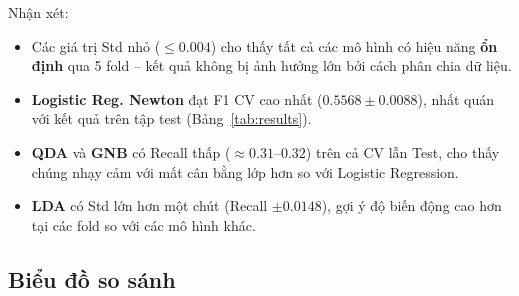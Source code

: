 \documentclass[12pt, a4paper]{article}
\begin{document}
\begin{table}[H]
  \centering
  \caption{5-Fold Cross-Validation (mean\,$\pm$\,std) trên Adult Census Income -- train+val set}
  \label{tab:cv_results}
\end{table}

Nhận xét:
\begin{itemize}
  \item Các giá trị Std nhỏ ($\leq 0.004$) cho thấy tất cả các mô hình có hiệu năng \textbf{ổn định} qua 5 fold -- kết quả không bị ảnh hưởng lớn bởi cách phân chia dữ liệu.
  \item \textbf{Logistic Reg. Newton} đạt F1 CV cao nhất ($0.5568 \pm 0.0088$), nhất quán với kết quả trên tập test (Bảng~\ref{tab:results}).
  \item \textbf{QDA} và \textbf{GNB} có Recall thấp ($\approx 0.31$--$0.32$) trên cả CV lẫn Test, cho thấy chúng nhạy cảm với mất cân bằng lớp hơn so với Logistic Regression.
  \item \textbf{LDA} có Std lớn hơn một chút (Recall $\pm 0.0148$), gợi ý độ biến động cao hơn tại các fold so với các mô hình khác.
\end{itemize}

\subsection{Biểu đồ so sánh}
\end{document}
